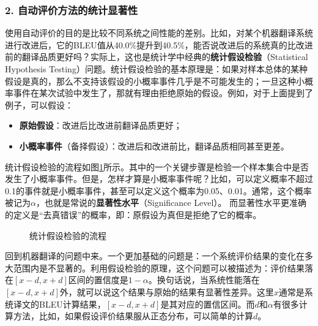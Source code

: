 \subsubsection{2. 自动评价方法的统计显著性}


\parinterval 使用自动评价的目的是比较不同系统之间性能的差别。比如，对某个机器翻译系统进行改进后，它的BLEU值从40.0$\%$提升到40.5$\%$，能否说改进后的系统真的比改进前的翻译品质更好吗？实际上，这也是统计学中经典的{\small\sffamily\bfseries{统计假设检验}}（Statistical Hypothesis Testing）问题。统计假设检验的基本原理是：如果对样本总体的某种假设是真的，那么不支持该假设的小概率事件几乎是不可能发生的；一旦这种小概率事件在某次试验中发生了，那就有理由拒绝原始的假设。例如，对于上面提到了例子，可以假设：

\begin{itemize}
\vspace{0.5em}
\item {\small\sffamily\bfseries{原始假设}}：改进后比改进前翻译品质更好；
\vspace{0.5em}
\item {\small\sffamily\bfseries{小概率事件}}（备择假设）：改进后和改进前比，翻译品质相同甚至更差。
\vspace{0.5em}
\end{itemize}

\parinterval 统计假设检验的流程如图\ref{fig:4-13}所示。其中的一个关键步骤是检验一个样本集合中是否发生了小概率事件。但是，怎样才算是小概率事件呢？比如，可以定义概率不超过0.1的事件就是小概率事件，甚至可以定义这个概率为0.05、0.01。通常，这个概率被记为$\alpha$，也就是常说的{\small\sffamily\bfseries{显著性水平}}（Significance Level）。 而显著性水平更准确的定义是“去真错误”的概率，即：原假设为真但是拒绝了它的概率。

\begin{figure}[htp]
    \centering
	
   \caption{统计假设检验的流程}
   \label{fig:4-13}
\end{figure}

\parinterval 回到机器翻译的问题中来。一个更加基础的问题是：一个系统评价结果的变化在多大范围内是不显著的。利用假设检验的原理，这个问题可以被描述为：评价结果落在$[x-d,x+d]$区间的置信度是$1-\alpha$。换句话说，当系统性能落在$[x-d, x+d]$外，就可以说这个结果与原始的结果有显著性差异。这里$x$通常是系统译文的BLEU计算结果，$[x-d,x+d]$是其对应的置信区间。而$d$和$\alpha$有很多计算方法，比如，如果假设评价结果服从正态分布，可以简单的计算$d$。

